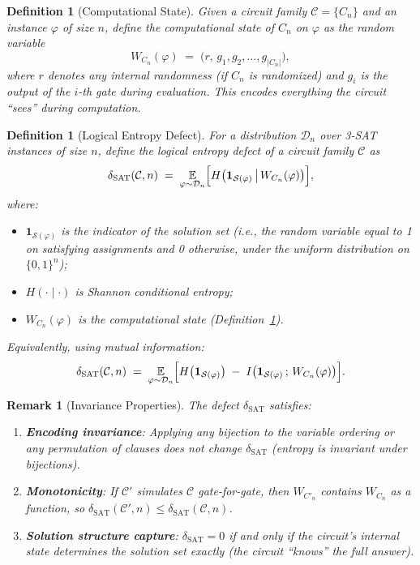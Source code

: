 \documentclass[11pt]{article}
\newtheorem{definition}[lemma]{Definition}
\newtheorem{remark}[lemma]{Remark}
\theoremstyle{definition}
\begin{document}
\begin{definition}[Computational State]
\label{def:compstate}
Given a circuit family $\mathcal{C} = \{C_n\}$ and an instance $\varphi$ of size $n$,
define the \emph{computational state} of $C_n$ on $\varphi$ as the random variable
\[
  W_{C_n}(\varphi) \;=\; \bigl( r,\, g_1, g_2, \ldots, g_{|C_n|} \bigr),
\]
where $r$ denotes any internal randomness (if $C_n$ is randomized)
and $g_i$ is the output of the $i$-th gate during evaluation.
This encodes everything the circuit ``sees'' during computation.
\end{definition}

\begin{definition}[Logical Entropy Defect]
\label{def:delta-SAT}
For a distribution $\mathcal{D}_n$ over 3-SAT instances of size $n$, define the
\emph{logical entropy defect} of a circuit family $\mathcal{C}$ as
\[
  \delta_{\mathrm{SAT}}(\mathcal{C}, n) \;=\;
  \underset{\varphi \sim \mathcal{D}_n}{\mathbb{E}} \Bigl[
    H\bigl(\mathbf{1}_{\mathcal{S}(\varphi)} \,\big|\, W_{C_n}(\varphi)\bigr)
  \Bigr],
\]
where:
\begin{itemize}
  \item $\mathbf{1}_{\mathcal{S}(\varphi)}$ is the indicator of the solution set
    (i.e., the random variable equal to 1 on satisfying assignments and 0 otherwise,
    under the uniform distribution on $\{0,1\}^n$);
  \item $H(\cdot \mid \cdot)$ is Shannon conditional entropy;
  \item $W_{C_n}(\varphi)$ is the computational state (Definition~\ref{def:compstate}).
\end{itemize}

Equivalently, using mutual information:
\[
  \delta_{\mathrm{SAT}}(\mathcal{C}, n) \;=\;
  \underset{\varphi \sim \mathcal{D}_n}{\mathbb{E}} \Bigl[
    H\bigl(\mathbf{1}_{\mathcal{S}(\varphi)}\bigr)
    \;-\;
    I\bigl(\mathbf{1}_{\mathcal{S}(\varphi)} \,;\, W_{C_n}(\varphi)\bigr)
  \Bigr].
\]
\end{definition}

\begin{remark}[Invariance Properties]
\label{rem:invariance}
The defect $\delta_{\mathrm{SAT}}$ satisfies:
\begin{enumerate}
  \item \textbf{Encoding invariance}: Applying any bijection to the variable ordering or any permutation of clauses does not change $\delta_{\mathrm{SAT}}$ (entropy is invariant under bijections).
  \item \textbf{Monotonicity}: If $\mathcal{C}'$ simulates $\mathcal{C}$ gate-for-gate, then $W_{C'_n}$ contains $W_{C_n}$ as a function, so $\delta_{\mathrm{SAT}}(\mathcal{C}', n) \leq \delta_{\mathrm{SAT}}(\mathcal{C}, n)$.
  \item \textbf{Solution structure capture}: $\delta_{\mathrm{SAT}} = 0$ if and only if the circuit's internal state determines the solution set exactly (the circuit ``knows'' the full answer).
\end{enumerate}
\end{remark}
\end{document}
